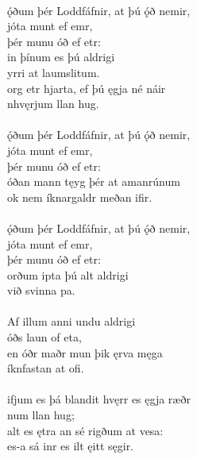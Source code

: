  \\

\bva {}ǫ́ðum þér Loddfáfnir, \hld at þú ǫ́ð nemir, \\%
\ind {}jóta munt ef emr, \\%
\ind þér munu óð ef etr: \\%
in þínum \hld {}es þú aldrigi \\%
\ind {}yrri at laumslitum. \\%
org etr hjarta, \hld ef þú ęgja né náir \\%
\ind {}nhvęrjum llan hug.\\%

 \\

\bva {}ǫ́ðum þér Loddfáfnir, \hld at þú ǫ́ð nemir, \\%
\ind {}jóta munt ef emr, \\%
\ind þér munu óð ef etr: \\%
óðan mann \hld tęyg þér at amanrúnum \\%
\ind ok nem íknargaldr meðan ifir.\\%

 \\

\bva {}ǫ́ðum þér Loddfáfnir, \hld at þú ǫ́ð nemir, \\%
\ind {}jóta munt ef emr, \\%
\ind þér munu óð ef etr: \\%
orðum ipta \hld þú alt aldrigi \\%
\ind við svinna pa.\\%

 \\

\bva Af illum anni \hld {}undu aldrigi \\%
\ind {}óðs laun of eta, \\%
en óðr maðr \hld mun þik ęrva męga \\%
\ind {}íknfastan at ofi.\\%

 \\

\bva {}ifjum es þá blandit \hld hvęrr es ęgja ræðr \\%
\ind {}num llan hug; \\%
alt es ętra \hld an sé rigðum at vesa: \\%
\ind es-a sá inr es ilt ęitt sęgir.\\%

